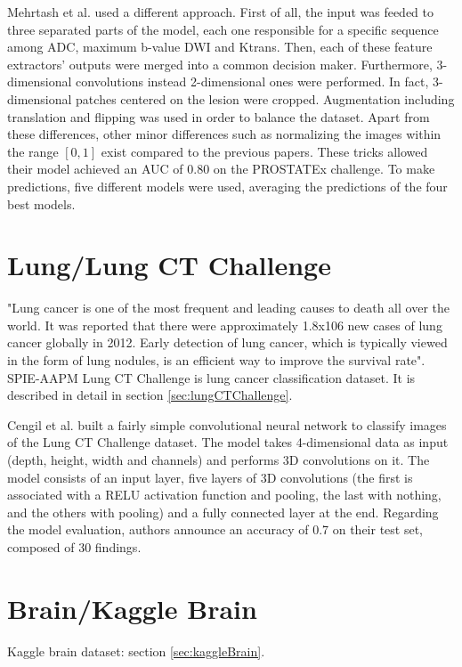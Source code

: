 Mehrtash et al. \cite{01} used a different approach. First of all, the input was feeded to three separated parts of the model, each one responsible for a specific sequence among ADC, maximum b-value DWI and Ktrans. Then, each of these feature extractors' outputs were merged into a common decision maker. Furthermore, 3-dimensional convolutions instead 2-dimensional ones were performed. In fact, 3-dimensional patches centered on the lesion were cropped. Augmentation including translation and flipping was used in order to balance the dataset. Apart from these differences, other minor differences such as normalizing the images within the range $[0,1]$ exist compared to the previous papers. These tricks allowed their model achieved an AUC of $0.80$ on the PROSTATEx challenge. To make predictions, five different models were used, averaging the predictions of the four best models. 


\section{Lung/Lung CT Challenge}
"Lung cancer is one of the most frequent and leading causes to death all over the world. It was reported that there were approximately 1.8x106 new cases of lung cancer globally in 2012. Early detection of lung cancer, which is typically viewed in the form of lung nodules, is an efficient way to improve the survival rate"\cite{41}.
SPIE-AAPM Lung CT Challenge is lung cancer classification dataset. It is described in detail in section \ref{sec:lungCTChallenge}.

Cengil et al. \cite{02} built a fairly simple convolutional neural network to classify images of the Lung CT Challenge dataset. The model takes 4-dimensional data as input (depth, height, width and channels) and performs 3D convolutions on it. The model consists of an input layer, five layers of 3D convolutions (the first is associated with a RELU activation function and pooling, the last with nothing, and the others with pooling) and a fully connected layer at the end. Regarding the model evaluation, authors announce an accuracy of 0.7 on their test set, composed of 30 findings.


\section{Brain/Kaggle Brain}
Kaggle brain dataset: section \ref{sec:kaggleBrain}.


